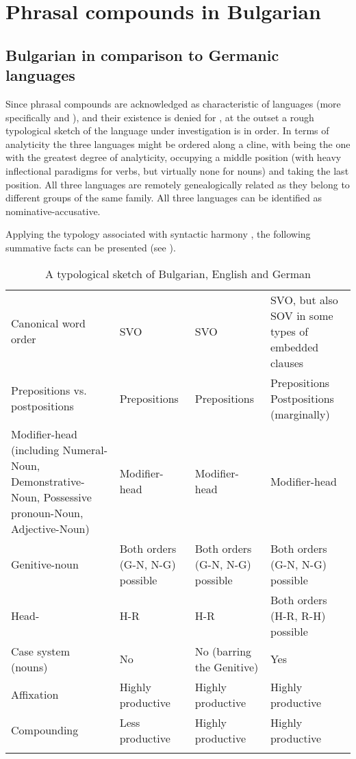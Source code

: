 \documentclass[output=paper]{LSP/langsci}
\begin{document}
\section{Phrasal compounds in Bulgarian}\label{sec:bagasheva:4}



\subsection{Bulgarian in comparison to Germanic languages}\label{sec:bagasheva:4.1}



Since phrasal compounds are acknowledged as characteristic of  languages (more specifically  and ), and their existence is denied for , at the outset a rough typological sketch of the language under investigation is in order. In terms of analyticity the three languages might be ordered along a cline, with  being the one with the greatest degree of analyticity,  occupying a middle position (with heavy inflectional paradigms for verbs, but virtually none for nouns) and  taking the last position. All three languages are remotely genealogically related as they belong to different groups of the same family. All three languages can be identified as nominative-accusative. 

Applying the typology associated with syntactic harmony \citep{Hawkins1983}, the following summative facts can be presented (see ).


\begin{table}
\caption{A typological sketch of Bulgarian, English and German}
\label{tab:bagasheva:1}

\begin{tabularx}{\textwidth}{QQQQ} 
\lsptoprule
&  &  & \\
\midrule
Canonical word order & SVO & SVO & SVO, but also SOV in some types of embedded clauses\\
\tablevspace
Prepositions vs. postpositions & Prepositions & Prepositions & Prepositions
\newline
Postpositions (marginally)\\
\tablevspace
Modifier-head (including Numeral-Noun, Demonstrative-Noun, Possessive pronoun-Noun, Adjective-Noun) & Modifier-head & Modifier-head & Modifier-head\\
\tablevspace
Genitive-noun & Both orders (G-N, N-G) possible & Both orders (G-N, N-G) possible & Both orders (G-N, N-G) possible\\
\tablevspace
Head- & H-R & H-R & Both orders (H-R, R-H) possible\\
\tablevspace
Case system (nouns) & No & No (barring the Genitive) & Yes\\
\tablevspace
Affixation & Highly productive & Highly productive & Highly productive\\
\tablevspace
Compounding & Less productive & Highly productive & Highly productive\\
\lspbottomrule
\end{tabularx}
\end{table}
\end{document}
